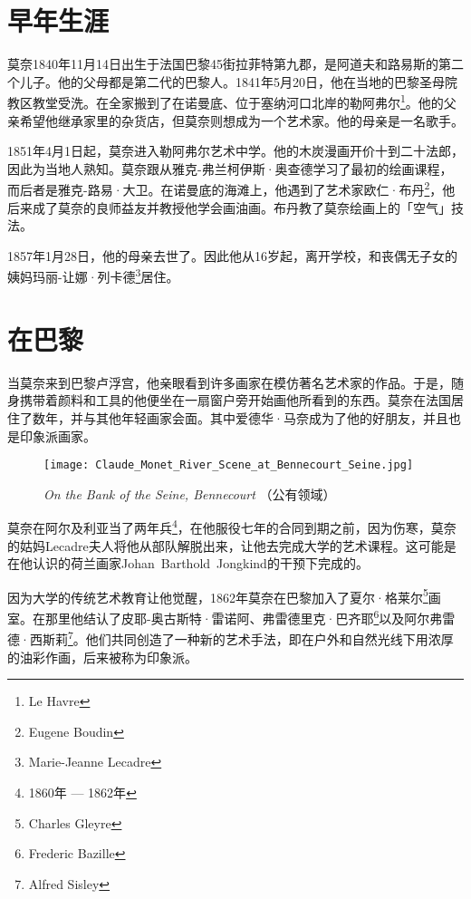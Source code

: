     \section{早年生涯}

        莫奈1840年11月14日出生于法国巴黎45街拉菲特第九郡，是阿道夫和路易斯的第二个儿子。他的父母都是第二代的巴黎人。1841年5月20日，他在当地的巴黎圣母院教区教堂受洗。在全家搬到了在诺曼底、位于塞纳河口北岸的勒阿弗尔\footnote{Le Havre}。他的父亲希望他继承家里的杂货店，但莫奈则想成为一个艺术家。他的母亲是一名歌手。

        1851年4月1日起，莫奈进入勒阿弗尔艺术中学。他的木炭漫画开价十到二十法郎，因此为当地人熟知。莫奈跟从雅克-弗兰柯伊斯·奥查德学习了最初的绘画课程，而后者是雅克-路易·大卫。在诺曼底的海滩上，他遇到了艺术家欧仁·布丹\footnote{Eugene Boudin}，他后来成了莫奈的良师益友并教授他学会画油画。布丹教了莫奈绘画上的「空气」技法。

        1857年1月28日，他的母亲去世了。因此他从16岁起，离开学校，和丧偶无子女的姨妈玛丽-让娜·列卡德\footnote{Marie-Jeanne Lecadre}居住。

    \section{在巴黎}

        当莫奈来到巴黎卢浮宫，他亲眼看到许多画家在模仿著名艺术家的作品。于是，随身携带着颜料和工具的他便坐在一扇窗户旁开始画他所看到的东西。莫奈在法国居住了数年，并与其他年轻画家会面。其中爱德华·马奈成为了他的好朋友，并且也是印象派画家。

        \begin{figure}[h!]
          \centering
          \texttt{[image: Claude\_Monet\_River\_Scene\_at\_Bennecourt\_Seine.jpg]}
          \caption{\textit{On the Bank of the Seine, Bennecourt} （公有领域）}
          \label{fig:on-the-bank-of-the-seine}
        \end{figure}

        莫奈在阿尔及利亚当了两年兵\footnote{1860年 --- 1862年}，在他服役七年的合同到期之前，因为伤寒，莫奈的姑妈Lecadre夫人将他从部队解脱出来，让他去完成大学的艺术课程。这可能是在他认识的荷兰画家Johan~Barthold~Jongkind的干预下完成的。

        因为大学的传统艺术教育让他觉醒，1862年莫奈在巴黎加入了夏尔·格莱尔\footnote{Charles Gleyre}画室。在那里他结认了皮耶-奥古斯特·雷诺阿、弗雷德里克·巴齐耶\footnote{Frederic Bazille}以及阿尔弗雷德·西斯莉\footnote{Alfred Sisley}。他们共同创造了一种新的艺术手法，即在户外和自然光线下用浓厚的油彩作画，后来被称为印象派。

